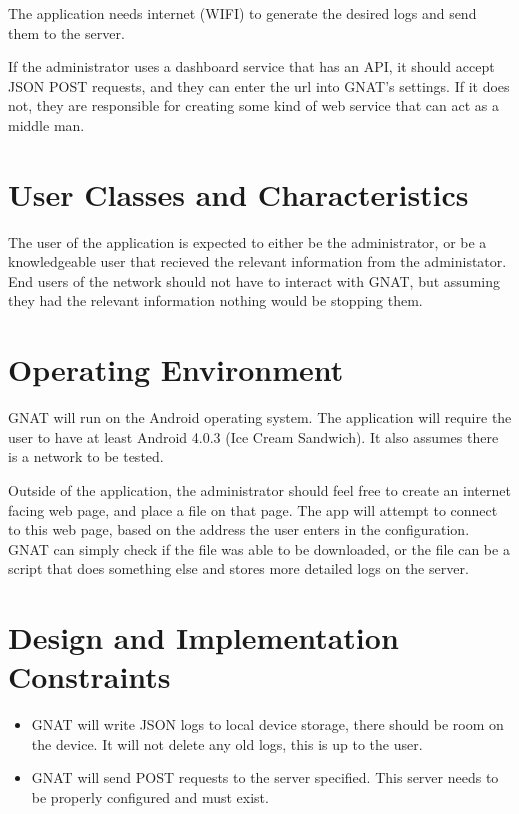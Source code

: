 \documentclass{scrreprt}
\begin{document}
The application needs internet (WIFI) to generate the desired logs and send them to the server. 

If the administrator uses a dashboard service that has an API, it should accept JSON POST requests, and they can enter the url into GNAT's settings.  If it does not, they are responsible for creating some kind of web service that can act as a middle man.

\section{User Classes and Characteristics}
The user of the application is expected to either be the administrator, or be a knowledgeable user that recieved the relevant information from the administator.  End users of the network should not have to interact with GNAT, but assuming they had the relevant information nothing would be stopping them.

\section{Operating Environment}
GNAT will run on the Android operating system.  The application will require the user to have at least Android 4.0.3 (Ice Cream Sandwich). It also assumes there is a network to be tested.

Outside of the application, the administrator should feel free to create an internet facing web page, and place a file on that page.  The app will attempt to connect to this web page, based on the address the user enters in the configuration. GNAT can simply check if the file was able to be downloaded, or the file can be a script that does something else and stores more detailed logs on the server.

\section{Design and Implementation Constraints}

\begin{itemize}
\item GNAT will write JSON logs to local device storage, there should be room on the device. It will not delete any old logs, this is up to the user.
  \item GNAT will send POST requests to the server specified.  This server needs to be properly configured and must exist.
\end{itemize}
\end{document}

